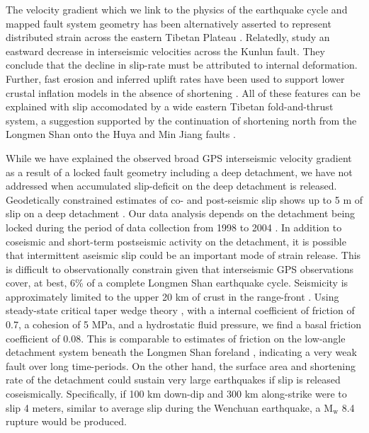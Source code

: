 \documentclass[12pt]{article}
\begin{document}
The velocity gradient which we link to the physics of the earthquake cycle and mapped fault system geometry has been alternatively asserted to represent distributed strain across the eastern Tibetan Plateau \citep{Royden2008}. Relatedly, \citet{kirby07} study an eastward decrease in interseismic velocities across the Kunlun fault. They conclude that the decline in slip-rate must be attributed to internal deformation. Further, fast erosion and inferred uplift rates have been used to support lower crustal inflation models in the absence of shortening \citep{Kirby2003}. All of these features can be explained with slip accomodated by a wide eastern Tibetan fold-and-thrust system, a suggestion supported by the continuation of shortening north from the Longmen Shan onto the Huya \citep{kirby00} and Min Jiang faults \citep{Chen1994}. 

While we have explained the observed broad GPS interseismic velocity gradient as a result of a locked fault geometry including a deep detachment, we have not addressed when accumulated slip-deficit on the deep detachment is released. Geodetically constrained estimates of co- and post-seismic slip shows up to 5 m of slip on a deep detachment \citep{Qi2011}. Our data analysis depends on the detachment being locked during the period of data collection from 1998 to 2004 \citep{gan07}. In addition to coseismic and short-term postseismic activity on the detachment, it is possible that intermittent aseismic slip could be an important mode of strain release. This is difficult to observationally constrain given that interseismic GPS observations cover, at best, 6\% of a complete Longmen Shan earthquake cycle. Seismicity is approximately limited to the upper 20 km of crust in the range-front \citep{Li2010a}. Using steady-state critical taper wedge theory \citep{dahlen90}, with a internal coefficient of friction of 0.7, a cohesion of 5 MPa, and a hydrostatic fluid pressure, we find a basal friction coefficient of 0.08. This is comparable to estimates of friction on the low-angle detachment system beneath the Longmen Shan foreland \citep{Hubbard2010}, indicating a very weak fault over long time-periods. On the other hand, the surface area and shortening rate of the detachment could sustain very large earthquakes if slip is released coseismically. Specifically, if 100 km down-dip and 300 km along-strike were to slip 4 meters, similar to average slip during the Wenchuan earthquake, a $\textrm{M}_{\textrm{w}}$ 8.4 rupture would be produced.
\end{document}
